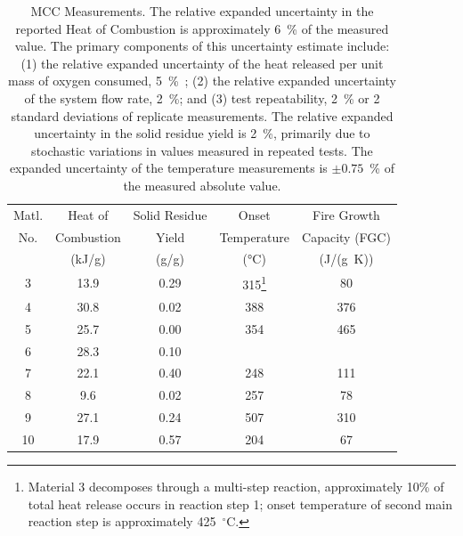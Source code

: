 \begin{table}
\caption[MCC Measurements]{MCC Measurements. The relative expanded uncertainty in the reported Heat of Combustion is approximately 6~\% of the measured value. The primary components of this uncertainty estimate include: (1) the relative expanded uncertainty of the heat released per unit mass of oxygen consumed, 5~\%~\cite{Huggett:1}; (2) the relative expanded uncertainty of the system flow rate, 2~\%; and (3) test repeatability, 2~\% or 2 standard deviations of replicate measurements. The relative expanded uncertainty in the solid residue yield is 2~\%, primarily due to stochastic variations in values measured in repeated tests. The expanded uncertainty of the temperature measurements is $\pm 0.75$~\% of the measured absolute value. }
\label{MCC}
\begin{minipage}{\textwidth}
\begin{tabular}{ccccc}
\hline
Matl.  & Heat of        & Solid Residue    & Onset              & Fire Growth             \\
No.    & Combustion     & Yield            & Temperature        & Capacity (FGC)          \\
       & (kJ/g)         & (g/g)            & (°C)               & (J/(g~K))               \\ \hline
3      &  13.9          & 0.29             & 315\footnote{Material 3 decomposes through a multi-step reaction, approximately 10\% of total heat release occurs in reaction step 1; onset temperature of second main reaction step is approximately 425~$^\circ$C.}     & 80             \\
4      &  30.8          & 0.02             & 388                & 376                     \\
5      &  25.7          & 0.00             & 354                & 465         \\
6      &  28.3          & 0.10             &                    &              \\
7      &  22.1          & 0.40             & 248                & 111            \\
8      &   9.6          & 0.02             & 257                &  78           \\
9      &  27.1          & 0.24             & 507                & 310             \\
10     &  17.9          & 0.57             & 204                &  67            \\
\hline
\end{tabular}
\end{minipage}
\end{table}




